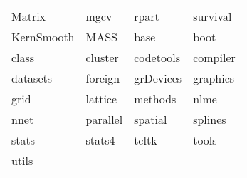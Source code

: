 \begin{tabular}{llll} 
Matrix & mgcv & rpart & survival\\ 
KernSmooth & MASS & base & boot\\ 
class & cluster & codetools & compiler\\ 
datasets & foreign & grDevices & graphics\\ 
grid & lattice & methods & nlme\\ 
nnet & parallel & spatial & splines\\ 
stats & stats4 & tcltk & tools\\ 
utils  &   &   \\ 
\end{tabular}
